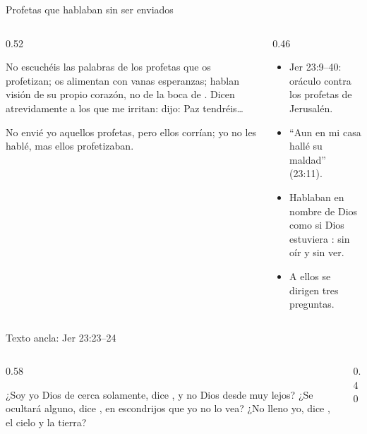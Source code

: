 \begin{frame}{Profetas que hablaban sin ser enviados}
\begin{columns}[t,onlytextwidth]
\begin{column}{0.52\textwidth}
\begin{cita}[fontupper=\scriptsize\itshape]No escuchéis las palabras de los profetas que os profetizan; os alimentan con vanas esperanzas; hablan visión de su propio corazón, no de la boca de \SENOR. Dicen atrevidamente a los que me irritan: \SENOR{} dijo: Paz tendréis\ldots{}\end{cita}
\begin{cita}[fontupper=\scriptsize\itshape]No envié yo aquellos profetas, pero ellos corrían; yo no les hablé, mas ellos profetizaban.\end{cita}
\end{column}
\begin{column}{0.46\textwidth}\small
\begin{itemize}
\item Jer 23:9--40: oráculo contra los profetas de Jerusalén.
\item ``Aun en mi casa hallé su maldad'' (23:11).
\item Hablaban en nombre de Dios como si Dios estuviera : sin oír y sin ver.
\item A ellos se dirigen tres preguntas.
\end{itemize}
\end{column}
\end{columns}
\end{frame}

\begin{frame}{Texto ancla: Jer 23:23--24}
\begin{columns}[c,onlytextwidth]
\begin{column}{0.58\textwidth}
\begin{cita}¿Soy yo Dios de cerca solamente, dice \SENOR, y no Dios desde muy lejos? ¿Se ocultará alguno, dice \SENOR, en escondrijos que yo no lo vea? ¿No lleno yo, dice \SENOR, el cielo y la tierra?\end{cita}
\end{column}
\begin{column}{0.40\textwidth}\end{column}
\end{columns}
\end{frame}

